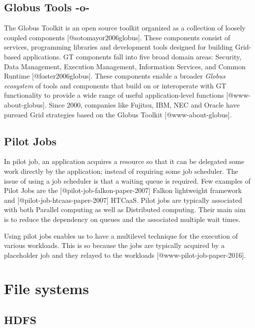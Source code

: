 \subsection{Globus Tools -o-}

The Globus Toolkit is an open source toolkit organized as a collection
of loosely coupled components [@sotomayor2006globus]. These
components consist of services, programming libraries and development
tools designed for building Grid-based applications. GT components
fall into five broad domain areas: Security, Data Management,
Execution Management, Information Services, and Common
Runtime [@foster2006globus]. These components enable a broader
\textit{Globus ecosystem} of tools and components that build on or
interoperate with GT functionality to provide a wide range of useful
application-level functions [@www-about-globus]. Since 2000,
companies like Fujitsu, IBM, NEC and Oracle have pursued Grid
strategies based on the Globus Toolkit [@www-about-globus].



\subsection{Pilot Jobs}

In pilot job, an application acquires a resource so that it can be
delegated some work directly by the application; instead of requiring
some job scheduler. The issue of using a job scheduler is that a
waiting queue is required. Few examples of Pilot Jobs are
the [@pilot-job-falkon-paper-2007] Falkon lightweight framework
and [@pilot-job-htcaas-paper-2007] HTCaaS. Pilot jobs are
typically associated with both Parallel computing as well as
Distributed computing. Their main aim is to reduce the dependency on
queues and the associated multiple wait times.

Using pilot jobs enables us to have a multilevel technique for the
execution of various workloads. This is so because the jobs are
typically acquired by a placeholder job and they relayed to the
workloads [@www-pilot-job-paper-2016].

\section{File systems}


\subsection{HDFS}
     
